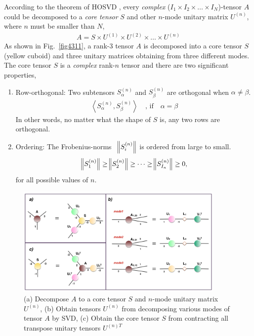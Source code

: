 According to the theorem of HOSVD \cite{doi:10.1137/S0895479896305696}, every \textit{complex} ($ I_1 \times I_2 \times \dots \times I_N$)-tensor $A$ could be decomposed to a \textit{core tensor} $S$ and other $n$-mode unitary matrix $U^{(n)}$, where $n$ must be smaller than $N$,
\begin{align}
	A = S \times U^{(1)} \times U^{(2)} \times \dots \times U^{(n)}
\end{align} 
As shown in Fig.~\ref{fig4311}, a rank-3 tensor $A$ is decomposed into a core tensor $S$ (yellow cuboid) and three unitary matrices obtaining from three different modes.  The core tensor $S$ is a \textit{complex} rank-$n$ tensor and there are two significant properties, \begin{enumerate}
	\item Row-orthogonal: Two subtensors $S_{\alpha}^{(n)}$ and $S_{\beta}^{(n)}$ are orthogonal when $\alpha \neq \beta$. 
		\begin{align}		
			\left\langle S^{(n)}_{\alpha},S^{(n)}_{\beta} \right\rangle \quad \text{, if} \quad \alpha = \beta
		\end{align}		
		In other words, no matter what the shape of $S$ is, any two rows are orthogonal.
	\item Ordering: The Frobenius-norms $\text{ } \norm{S^{(n)}_{i}} $ is ordered from large to small.
		\begin{align}		
			\norm{S^{(n)}_1} \geq \norm{S^{(n)}_2} \geq \dots \geq \norm{S^{(n)}_{I_n}} \geq 0,
		\end{align}		
		for all possible values of $n$.
\end{enumerate}
\begin{figure}[t]
	\centering
	\includegraphics[width=0.90\textwidth]{figures/fig4312.png}
	\caption[The tensor-network representation of HOSVD]{(a) Decompose $A$ to a core tensor $S$ and $n$-mode unitary matrix $U^{(n)}$, (b) Obtain tensors $U^{(n)}$ from decomposing various modes of tensor $A$ by SVD, (c) Obtain the core tensor $S$ from contracting all transpose unitary tensors $U^{(n)T}$ }
	\label{fig4312}
\end{figure}

